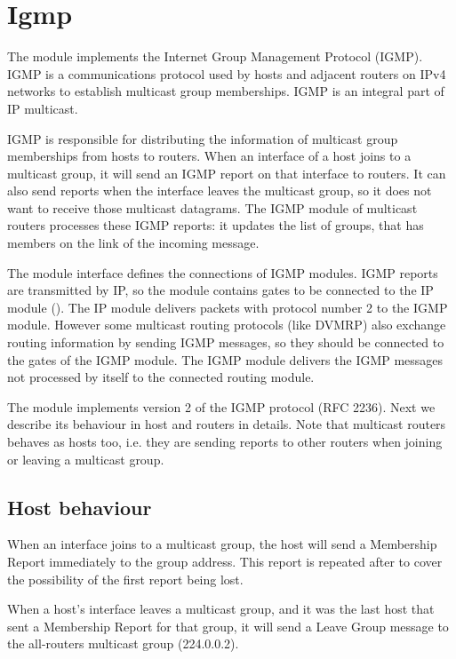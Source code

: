 \section{Igmp}

The  module implements the Internet Group Management Protocol
(IGMP). IGMP is a communications protocol used by hosts and adjacent routers on
IPv4 networks to establish multicast group memberships. IGMP is an integral part
of IP multicast.

IGMP is responsible for distributing the information of
multicast group memberships from hosts to routers. When an interface
of a host joins to a multicast group, it will send an IGMP report
on that interface to routers. It can also send reports when the
interface leaves the multicast group, so it does not want to
receive those multicast datagrams. The IGMP module of multicast
routers processes these IGMP reports: it updates the list of
groups, that has members on the link of the incoming message.

The  module interface defines the connections
of IGMP modules.
IGMP reports are transmitted by IP, so the module contains
gates to be connected to the IP module (). The IP
module delivers packets with protocol number 2 to the IGMP module.
However some multicast routing protocols (like DVMRP) also exchange
routing information by sending IGMP messages, so they should be
connected to the  gates of the IGMP module.
The IGMP module delivers the IGMP messages not processed by itself
to the connected routing module.

The  module implements version 2 of the IGMP protocol
(RFC 2236). Next we describe its behaviour in host and routers in details.
Note that multicast routers behaves as hosts too, i.e. they are sending
reports to other routers when joining or leaving a multicast group.

\subsection*{Host behaviour}

When an interface joins to a multicast group, the host
will send a Membership Report immediately to the group address.
This report is repeated after  to
cover the possibility of the first report being lost.

When a host's interface leaves a multicast group, and it was
the last host that sent a Membership Report for that group,
it will send a Leave Group message to the all-routers multicast
group (224.0.0.2).

